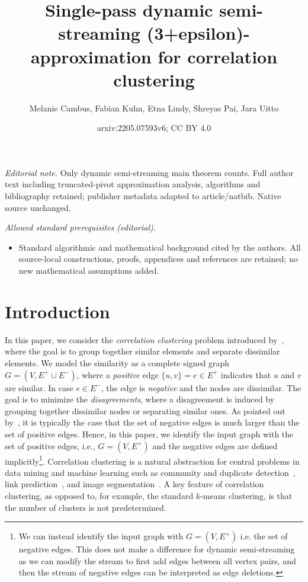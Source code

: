 \documentclass[10pt,a4paper]{article}
\title{Single-pass dynamic semi-streaming (3+epsilon)-approximation for correlation clustering}
\author{Melanie Cambus, Fabian Kuhn, Etna Lindy, Shreyas Pai, Jara Uitto}
\date{arxiv:2205.07593v6; CC BY 4.0}
\begin{document}
\maketitle
\noindent\textit{Editorial note.} Only dynamic semi-streaming main theorem counts. Full author text including truncated-pivot approximation analysis, algorithms and bibliography retained; publisher metadata adapted to article/natbib. Native source unchanged.\par\medskip
\noindent\textit{Allowed standard prerequisites (editorial).}\begin{itemize}
\item Standard algorithmic and mathematical background cited by the authors. All source-local constructions, proofs, appendices and references are retained; no new mathematical assumptions added.
\end{itemize}\medskip
\section{Introduction}
In this paper, we consider the \emph{correlation clustering} problem introduced by~\cite{bansal2004correlation}, where the goal is to group together similar elements and separate dissimilar elements.
We model the similarity as a complete signed graph $G = (V, E^+ \cup E^-)$, where a \emph{positive} edge $\{ u, v \} = e \in E^+$ indicates that $u$ and $v$ are similar.
In case $e \in E^-$, the edge is \emph{negative} and the nodes are dissimilar. 
The goal is to minimize the \emph{disagreements}, where a disagreement is induced by grouping together dissimilar nodes or separating similar ones.
As pointed out by~\cite{chierichetti2014correlation}, it is typically the case that the set of negative edges is much larger than the set of positive edges.
Hence, in this paper, we identify the input graph with the set of positive edges, i.e., $G = (V, E^+)$ and the negative edges are defined implicitly\footnote{We  can instead identify the input graph with $G = (V, E^+)$ i.e. the set of negative edges. This does not make a difference for dynamic semi-streaming as we can modify the stream to first add edges between all vertex pairs, and then the stream of negative edges can be interpreted as edge deletions.}.
Correlation clustering is a natural abstraction for central problems in data mining and machine learning such as community and duplicate detection~\cite{Arasu2009, Chen2012}, link prediction~\cite{Yaroslavtsev2018}, and image segmentation~\cite{Kim2011}.
A key feature of correlation clustering, as opposed to, for example, the standard $k$-means clustering, is that the number of clusters is not predetermined.
\end{document}

